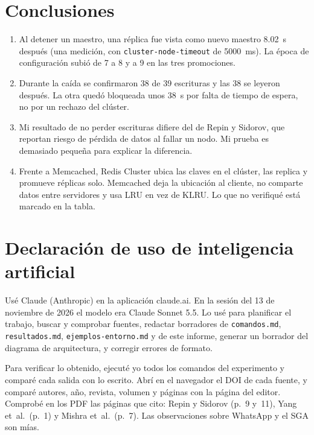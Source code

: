 \documentclass[11pt,a4paper]{article}
\begin{document}
\section{Conclusiones}

\begin{enumerate}
  \item Al detener un maestro, una réplica fue vista como nuevo maestro 8.02~s después (una medición, con \texttt{cluster-node-timeout} de 5000~ms). La época de configuración subió de 7 a 8 y a 9 en las tres promociones.
  \item Durante la caída se confirmaron 38 de 39 escrituras y las 38 se leyeron después. La otra quedó bloqueada unos 38~s por falta de tiempo de espera, no por un rechazo del clúster.
  \item Mi resultado de no perder escrituras difiere del de Repin y Sidorov, que reportan riesgo de pérdida de datos al fallar un nodo. Mi prueba es demasiado pequeña para explicar la diferencia.
  \item Frente a Memcached, Redis Cluster ubica las claves en el clúster, las replica y promueve réplicas solo. Memcached deja la ubicación al cliente, no comparte datos entre servidores y usa LRU en vez de KLRU. Lo que no verifiqué está marcado en la tabla.
\end{enumerate}

\section{Declaración de uso de inteligencia artificial}

Usé Claude (Anthropic) en la aplicación claude.ai. En la sesión del 13 de noviembre de 2026 el modelo era Claude Sonnet 5.5. Lo usé para planificar el trabajo, buscar y comprobar fuentes, redactar borradores de \texttt{comandos.md}, \texttt{resultados.md}, \texttt{ejemplos-entorno.md} y de este informe, generar un borrador del diagrama de arquitectura, y corregir errores de formato.

Para verificar lo obtenido, ejecuté yo todos los comandos del experimento y comparé cada salida con lo escrito. Abrí en el navegador el DOI de cada fuente, y comparé autores, año, revista, volumen y páginas con la página del editor. Comprobé en los PDF las páginas que cito: Repin y Sidorov (p.~9 y~11), Yang et~al.\ (p.~1) y Mishra et~al.\ (p.~7). Las observaciones sobre WhatsApp y el SGA son mías.

\printbibliography[title={Referencias}]
\end{document}

